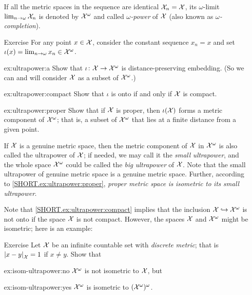 If all the metric spaces in the sequence are identical $\mathcal{X}_n=\mathcal{X}$, 
its $\omega$-limit 
$\lim_{n\to\omega}\mathcal{X}_n$
is denoted by $\mathcal{X}^\omega$
and called \emph{$\omega$-power} of $\mathcal{X}$ (also known as \emph{$\omega$-completion}).



\begin{thm}{Exercise}\label{ex:ultrapower}
For any point $x\in \mathcal{X}$, consider the constant sequence $x_n=x$
and set $\iota(x)=\lim_{n\to\omega}x_n\in\mathcal{X}^\omega$.

\begin{subthm}{ex:ultrapower:a}
Show that $\iota\colon\mathcal{X}\to\mathcal{X}^\omega$ is distance-preserving embedding. (So we can and will consider $\mathcal{X}$ as a subset of $\mathcal{X}^\omega$.)
\end{subthm}

\begin{subthm}{ex:ultrapower:compact} 
Show that $\iota$ is onto if and only if $\mathcal{X}$ is compact.
\end{subthm}

\begin{subthm}{ex:ultrapower:proper} 
Show that if $\mathcal{X}$ is proper, then $\iota(\mathcal{X})$ forms a metric component of $\mathcal{X}^\omega$; that is, a subset of $\mathcal{X}^\omega$ that lies at a finite distance from a given point.
\end{subthm}

\end{thm}

If $\mathcal{X}$ is a genuine metric space, then the metric component of $\mathcal{X}$ in $\mathcal{X}^\omega$ is also called the ultrapower of $\mathcal{X}$;
if needed, we may call it the \emph{small ultrapower}, and the whole space $\mathcal{X}^\omega$ could be called the \emph{big ultrapower} of $\mathcal{X}$.
Note that the small ultrapower of genuine metric space is a genuine metric space.
Further, according to \ref{SHORT.ex:ultrapower:proper}, \textit{proper metric space is isometric to its small ultrapower}.

Note that \ref{SHORT.ex:ultrapower:compact} implies that the inclusion $\mathcal{X}\hookrightarrow\mathcal{X}^\omega$ is not onto if the space $\mathcal{X}$ is not compact.
However, the spaces $\mathcal{X}$ and $\mathcal{X}^\omega$ might be isometric; here is an example:

\begin{thm}{Exercise}\label{ex:isom-ultrapower}
Let $\mathcal{X}$ be an infinite countable set with \emph{discrete metric};
that is $\dist{x}{y}{\spc{X}}=1$ if $x\ne y$.
Show that 

\begin{subthm}{ex:isom-ultrapower:no}
$\mathcal{X}^\omega$ is not isometric to $\mathcal{X}$, but
\end{subthm}

\begin{subthm}{ex:isom-ultrapower:yes}
$\mathcal{X}^\omega$ is  isometric to $(\mathcal{X}^\omega)^\omega$.
\end{subthm}

\end{thm}

